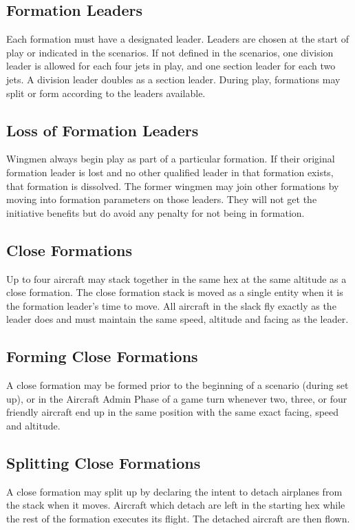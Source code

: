 \begin{advancedrules}
    \subsection{Formation Leaders} Each formation must have a designated leader. Leaders are chosen at the start of play or indicated in the scenarios.  If not defined in the scenarios, one division leader is allowed for each four jets in play, and one section leader for each two jets. A division leader doubles as a section leader. During play, formations may split or form according to the leaders available.

    \subsection{Loss of Formation Leaders} Wingmen always begin play as part of a particular formation. If their original formation leader is lost and no other qualified leader in that formation exists, that formation is dissolved. The former wingmen may join other formations by moving into formation parameters on those leaders. They will not get the initiative benefits but do avoid any penalty for not being in formation.

    \subsection{Close Formations}
    \label{rule:close-formations}

    Up to four aircraft may stack together in the same hex at the same altitude as a close formation. The close formation stack is moved as a single entity when it is the formation leader's time to move. All aircraft in the slack fly exactly as the leader does and must maintain the same speed, altitude and facing as the leader.

    \subsection{Forming Close Formations} A close formation may be formed prior to the beginning of a scenario (during set up), or in the Aircraft Admin Phase of a game turn whenever two, three, or four friendly aircraft end up in the same position with the same exact facing, speed and altitude.

    \subsection{Splitting Close Formations} A close formation may split up by declaring the intent to detach airplanes from the stack when it moves. Aircraft which detach are left in the starting hex while the rest of the formation executes its flight. The detached aircraft are then flown.


\end{advancedrules}
